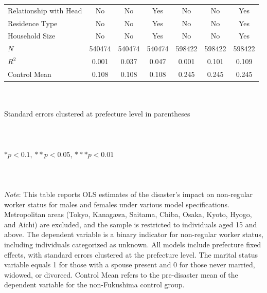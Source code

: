 \documentclass[serif, aspectratio=169]{beamer}
\newcommand{\nonregularlinks}{%
    \vfill %
    \hfill %
    {\small %
        \hyperlink{nonregular_placebo}{\beamerbutton{Placebo test}} \,
    }
}
\begin{document}
\begin{frame}[label=nonregular_status]
\begin{table}[htbp]
\begin{tabular}{@{}l*{6}{c}@{}}
Relationship with Head&       No         &       No         &      Yes         &       No         &       No         &      Yes         \\
Residence Type&       No         &       No         &      Yes         &       No         &       No         &      Yes         \\
Household Size&       No         &       No         &      Yes         &       No         &       No         &      Yes         \\
$\textit{N}$&   540474         &   540474         &   540474         &   598422         &   598422         &   598422         \\
$\textit{R}^2$&    0.001         &    0.037         &    0.047         &    0.001         &    0.101         &    0.109         \\
Control Mean&    0.108         &    0.108         &    0.108         &    0.245         &    0.245         &    0.245         \\
\bottomrule
\end{tabular}
\\\\{\linewidth}{\tiny Standard errors clustered at prefecture level in parentheses}\\\\
\\\\{\linewidth}{\tiny $*p<0.1$, $**p<0.05$, $***p<0.01$}\\\\
\\\\{\linewidth}{\tiny \textit{Note}: This table reports OLS estimates of the disaster's impact on non-regular worker status for males and females under various model specifications. Metropolitan areas (Tokyo, Kanagawa, Saitama, Chiba, Osaka, Kyoto, Hyogo, and Aichi) are excluded, and the sample is restricted to individuals aged 15 and above. The dependent variable is a binary indicator for non-regular worker status, including individuals categorized as unknown. All models include prefecture fixed effects, with standard errors clustered at the prefecture level. The marital status variable equals 1 for those with a spouse present and 0 for those never married, widowed, or divorced. Control Mean refers to the pre-disaster mean of the dependent variable for the non-Fukushima control group.}
\end{table}

\vspace{-2.2cm}
\nonregularlinks


\end{frame}
\end{document}
